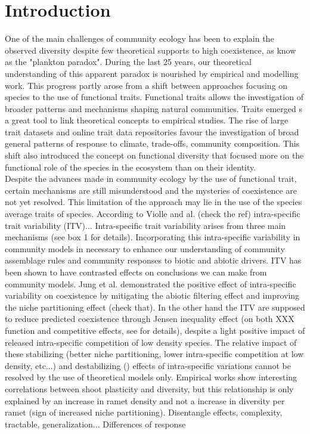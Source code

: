 \documentclass[review]{elsarticle}
\begin{document}
\section{Introduction}
\indent One of the main challenges of community ecology has been to explain the observed diversity despite few theoretical supports to high coexistence, as know as the "plankton paradox". During the last 25 years, our theoretical understanding of this apparent paradox is nourished by empirical and modelling work. This progress partly arose from a shift between approaches focusing on species to the use of functional traits. Functional traits allows the investigation of broader patterns and mechanisms shaping natural communities. Traits emerged s a great tool to link theoretical concepts to empirical studies. The rise of large trait datasets and online trait data repositories favour the investigation of broad general patterns of response to climate, trade-offs, community composition. This shift also introduced the concept on functional diversity that focused more on the functional role of the species in the ecosystem than on their identity.\\
\indent Despite the advances made in community ecology by the use of functional trait, certain mechanisms are still misunderstood and the mysteries of coexistence are not yet resolved. This limitation of the approach may lie in the use of the species average traits of species. According to Violle and al. (check the ref) intra-specific trait variability (ITV)... Intra-specific trait variability arises from three main mechanisms (see box 1 for details). Incorporating this intra-specific variability in community models in necessary to enhance our understanding of community assemblage rules and community responses to biotic and abiotic drivers. ITV has been shown to have contrasted effects on conclusions we can make from community models. Jung et al. demonstrated the positive effect of intra-specific variability on coexistence by mitigating the abiotic filtering effect and improving the niche partitioning effect (check that). In the other hand the ITV are supposed to reduce predicted coexistence through Jensen inequality effect (on both XXX function and competitive effects, see for details), despite a light positive impact of released intra-specific competition of low density species. The relative impact of these stabilizing (better niche partitioning, lower intra-specific competition at low density, etc...) and destabilizing () effects of intra-specific variations cannot be resolved by the use of theoretical models only. Empirical works show interesting correlations between shoot plasticity and diversity, but this relationship is only explained by an increase in ramet density and not a increase in diversity per ramet (sign of increased niche partitioning). Disentangle effects, complexity, tractable, generalization... Differences of response 
\end{document}

